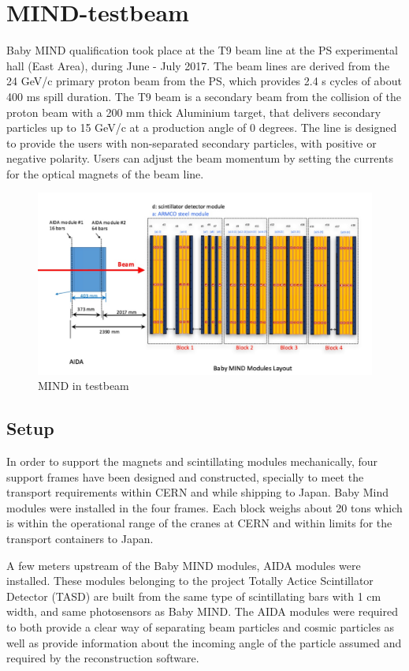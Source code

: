 \section{MIND-testbeam}

Baby MIND qualification took place at the T9 beam line at the PS experimental hall (East Area), during June - July 2017. The beam lines are derived from the 24 GeV/c primary proton beam from the PS, which provides 2.4 s cycles of about 400 ms spill duration. The T9 beam is a secondary beam from the collision of the proton beam with a 200 mm thick Aluminium target, that delivers secondary particles up to 15 GeV/c at a production angle of 0 degrees. The line is designed to provide the users with non-separated secondary particles, with positive or negative polarity. Users can adjust the beam momentum by setting the currents for the optical magnets of the beam line.

\begin{figure}[h!]
\centering
\includegraphics[width=\textwidth]{figures/MINDAIDAtestbeam.jpeg}
\caption{MIND in testbeam}
\label{fig:MINDtb}
\end{figure}

\subsection{Setup}

In order to support the magnets and scintillating modules mechanically, four support frames have been designed and constructed, specially to meet the transport requirements within CERN and while shipping to Japan. Baby Mind modules were installed in the four frames. Each block weighs about 20 tons which is within the operational range of the cranes at CERN and within limits for the transport containers to Japan.

A few meters upstream of the Baby MIND modules, AIDA modules were installed. These modules belonging to the project Totally Actice Scintillator Detector (TASD) are built from the same type of scintillating bars with 1 cm width, and same photosensors as Baby MIND. The AIDA modules were required to both provide a clear way of separating beam particles and cosmic particles as well as provide information about the incoming angle of the particle assumed and required by the reconstruction software.

